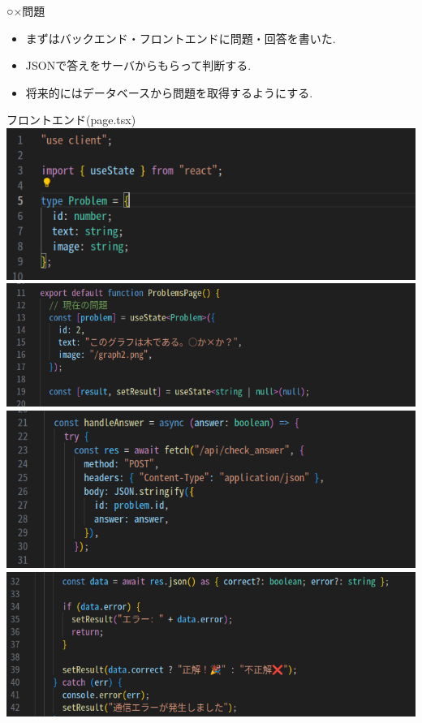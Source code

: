 \documentclass[aspectratio=169]{beamer}
\begin{document}
\begin{frame}{○×問題}
    \begin{itemize}
        \setlength{\itemsep}{2em}
        \item まずはバックエンド・フロントエンドに問題・回答を書いた.
        \item JSONで答えをサーバからもらって判断する.
        \item 将来的にはデータベースから問題を取得するようにする.
    \end{itemize}
\end{frame}

\begin{frame}[allowframebreaks]{フロントエンド(page.tsx)}
    \includegraphics[scale=0.6]{q1.png}
    \includegraphics[scale=0.6]{q2.png}
    \includegraphics[scale=0.6]{q3.png}
    \includegraphics[scale=0.6]{q4.png}
\end{frame}
\end{document}
